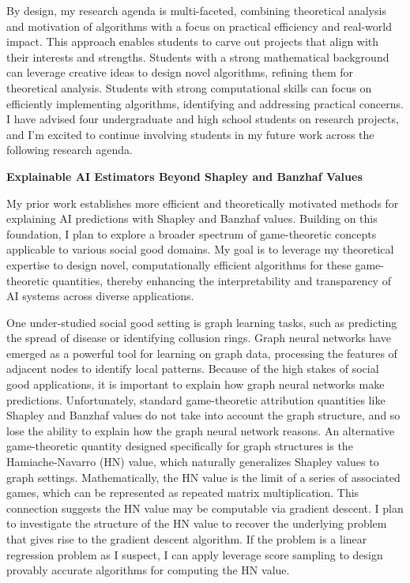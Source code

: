 \documentclass[11pt]{article}
\begin{document}
{By design, my research agenda is multi-faceted, combining theoretical analysis and motivation of algorithms with a focus on practical efficiency and real-world impact. This approach enables students to carve out projects that align with their interests and strengths. Students with a strong mathematical background can leverage creative ideas to design novel algorithms, refining them for theoretical analysis. Students with strong computational skills can focus on efficiently implementing algorithms, identifying and addressing practical concerns.
I have advised four undergraduate and high school students on research projects, and I'm excited to continue involving students in my future work across the following research agenda.

{\large \textbf{Explainable AI Estimators Beyond Shapley and Banzhaf Values}}

My prior work establishes more efficient and theoretically motivated methods for explaining AI predictions with Shapley and Banzhaf values.
Building on this foundation, I plan to explore a broader spectrum of game-theoretic concepts applicable to various social good domains. My goal is to leverage my theoretical expertise to design novel, computationally efficient algorithms for these game-theoretic quantities, thereby enhancing the interpretability and transparency of AI systems across diverse applications.

One under-studied social good setting is graph learning tasks, such as predicting the spread of disease or identifying collusion rings.
Graph neural networks have emerged as a powerful tool for learning on graph data, processing the features of adjacent nodes to identify local patterns.
Because of the high stakes of social good applications, it is important to explain how graph neural networks make predictions.
Unfortunately, standard game-theoretic attribution quantities like Shapley and Banzhaf values do not take into account the graph structure, and so lose the ability to explain how the graph neural network reasons.
An alternative game-theoretic quantity designed specifically for graph structures is the Hamiache-Navarro (HN) value, which naturally generalizes Shapley values to graph settings.
Mathematically, the HN value is the limit of a series of associated games, which can be represented as repeated matrix multiplication.
This connection suggests the HN value may be computable via gradient descent.
I plan to investigate the structure of the HN value to recover the underlying problem that gives rise to the gradient descent algorithm.
If the problem is a linear regression problem as I suspect, I can apply leverage score sampling to design provably accurate algorithms for computing the HN value.

}
\end{document}
